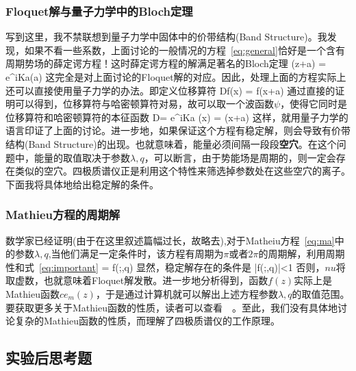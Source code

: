 \documentclass{article}
\begin{document}
\subsubsection{Floquet解与量子力学中的Bloch定理}
\par 写到这里，我不禁联想到量子力学中固体中的价带结构(Band Structure)。我发现，如果不看一些系数，上面讨论的一般情况的方程~\ref{eq:general}恰好是一个含有周期势场的薛定谔方程！这时薛定谔方程的解满足著名的Bloch定理
\beq
\psi(z+a) = e^{iKa}\psi(a)
\eeq
这完全是对上面讨论的Floquet解的对应。因此，处理上面的方程实际上还可以直接使用量子力学的办法。即定义位移算符
\beq
Df(x) = f(x+a)
\eeq
通过直接的证明可以得到，位移算符与哈密顿算符对易，故可以取一个波函数$\psi$，使得它同时是位移算符和哈密顿算符的本征函数
\beq
D\psi = e^{iKa} \psi(x) = \psi(x+a)
\eeq
这样，就用量子力学的语言印证了上面的讨论。进一步地，如果保证这个方程有稳定解，则会导致有价带结构(Band Structure)的出现。也就意味着，能量必须间隔一段段\textbf{空穴}。在这个问题中，能量的取值取决于参数$\lambda,q$，可以断言，由于势能场是周期的，则一定会存在类似的空穴。四极质谱仪正是利用这个特性来筛选掉参数处在这些空穴的离子。下面我将具体地给出稳定解的条件。

\subsubsection{Mathieu方程的周期解}
\par 数学家已经证明(由于在这里叙述篇幅过长，故略去),对于Matheiu方程~\ref{eq:ma}中的参数$\lambda,q$,当他们满足一定条件时，该方程有周期为$\pi$或者$2\pi$的周期解，利用周期性和式~\ref{eq:important}
\beq
\cos\nu \pi = f(\pi;\lambda,q)
\eeq
显然，稳定解存在的条件是
\beq
|f(\pi;\lambda,q)|<1
\eeq
否则，$nu$将取虚数，也就意味着Floquet解发散。进一步地分析得到，函数$f(z)$实际上是Mathieu函数$ce_m(z)$，于是通过计算机就可以解出上述方程参数$\lambda,q$的取值范围。要获取更多关于Mathieu函数的性质，读者可以查看~\cite{ma_func}~\cite{special_func}。至此，我们没有具体地讨论复杂的Mathieu函数的性质，而理解了四极质谱仪的工作原理。




\subsection{实验后思考题}


\end{document}
